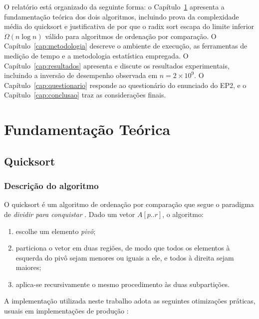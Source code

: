 \documentclass[
	12pt,
	oneside,
	a4paper,
	chapter=TITLE,
	section=TITLE,
	subsection=TITLE,
	subsubsection=TITLE,
	english,
	brazil
]{abntex2}
\theoremstyle{plain}
\theoremstyle{remark}
\renewcommand{\_}{\underscoreoriginal\allowbreak}
\begin{document}
O relatório está organizado da seguinte forma: o Capítulo~\ref{cap:fundamentacao} apresenta a fundamentação teórica dos dois algoritmos, incluindo prova da complexidade média do quicksort e justificativa de por que o radix sort escapa do limite inferior $\Omega(n \log n)$ válido para algoritmos de ordenação por comparação. O Capítulo~\ref{cap:metodologia} descreve o ambiente de execução, as ferramentas de medição de tempo e a metodologia estatística empregada. O Capítulo~\ref{cap:resultados} apresenta e discute os resultados experimentais, incluindo a inversão de desempenho observada em $n=2\times10^{9}$. O Capítulo~\ref{cap:questionario} responde ao questionário do enunciado do EP2, e o Capítulo~\ref{cap:conclusao} traz as considerações finais.

\OnehalfSpacing

\chapter{Fundamentação Teórica}
\label{cap:fundamentacao}

\section{Quicksort}

\subsection{Descrição do algoritmo}

O quicksort é um algoritmo de ordenação por comparação que segue o paradigma de \emph{dividir para conquistar} \cite{cormen2009}. Dado um vetor $A[p..r]$, o algoritmo:

\begin{enumerate}
	\item escolhe um elemento \emph{pivô};
	\item particiona o vetor em duas regiões, de modo que todos os elementos à esquerda do pivô sejam menores ou iguais a ele, e todos à direita sejam maiores;
	\item aplica-se recursivamente o mesmo procedimento às duas subpartições.
\end{enumerate}

A implementação utilizada neste trabalho adota as seguintes otimizações práticas, usuais em implementações de produção \cite{cormen2009}:
\end{document}
